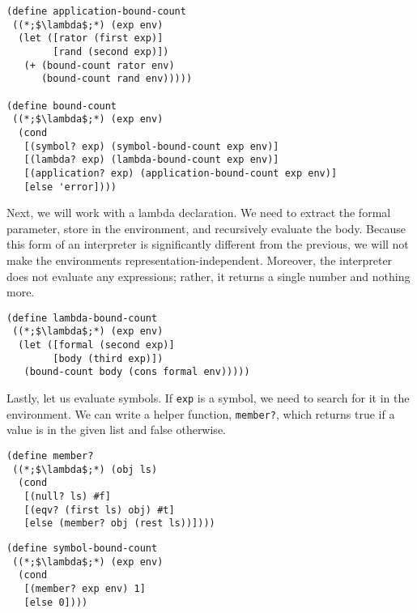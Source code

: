\begin{cl}[]{}\begin{lstlisting}[language=MyScheme]
(define application-bound-count
 ((*;$\lambda$;*) (exp env)
  (let ([rator (first exp)]
        [rand (second exp)])
   (+ (bound-count rator env)
      (bound-count rand env)))))
         
(define bound-count
 ((*;$\lambda$;*) (exp env)
  (cond
   [(symbol? exp) (symbol-bound-count exp env)]
   [(lambda? exp) (lambda-bound-count exp env)]
   [(application? exp) (application-bound-count exp env)]
   [else 'error])))
\end{lstlisting}\end{cl}

Next, we will work with a lambda declaration. We need to extract the formal parameter, store in the environment, and recursively evaluate the body. Because this form of an interpreter is significantly different from the previous, we will not make the environments representation-independent. Moreover, the interpreter does not evaluate any expressions; rather, it returns a single number and nothing more.

\begin{cl}[]{}\begin{lstlisting}[language=MyScheme]
(define lambda-bound-count
 ((*;$\lambda$;*) (exp env)
  (let ([formal (second exp)]
        [body (third exp)])
   (bound-count body (cons formal env)))))
\end{lstlisting}\end{cl}

Lastly, let us evaluate symbols. If \texttt{exp} is a symbol, we need to search for it in the environment. We can write a helper function, \texttt{member?}, which returns true if a value is in the given list and false otherwise.

\begin{cl}[]{}\begin{lstlisting}[language=MyScheme]
(define member?
 ((*;$\lambda$;*) (obj ls)
  (cond
   [(null? ls) #f]
   [(eqv? (first ls) obj) #t]
   [else (member? obj (rest ls))])))
\end{lstlisting}\end{cl}

\begin{cl}[]{}\begin{lstlisting}[language=MyScheme]
(define symbol-bound-count
 ((*;$\lambda$;*) (exp env)
  (cond
   [(member? exp env) 1]
   [else 0])))
\end{lstlisting}\end{cl}


